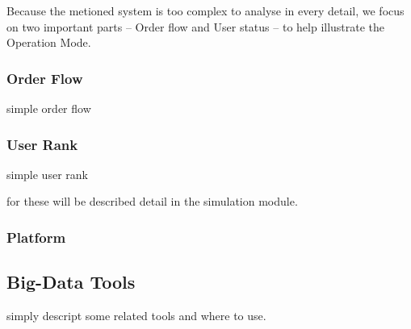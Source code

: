 Because the metioned system is too complex to analyse in every detail, we focus on two important parts -- Order flow and User status -- to help illustrate the Operation Mode.

\subsubsection{Order Flow}
simple order flow
\subsubsection{User Rank}
simple user rank

for these will be described detail in the simulation module.
\subsubsection{Platform}
\subsection{Big-Data Tools}
simply descript some related tools and where to use.
